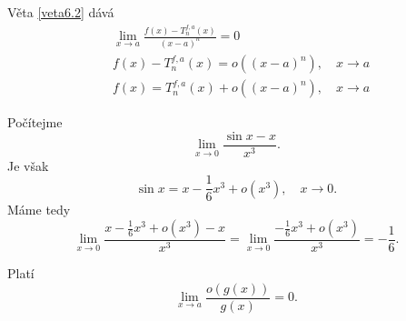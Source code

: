 \begin{poznamka}
	Věta \ref{veta6.2} dává
	\begin{align*}
	&\lim_{x\to a} \frac{f(x)-T_n^{f,a}(x)}{(x-a)^n}=0\\
	& f(x)- T_n^{f,a}(x)=o((x-a)^n), \quad x\to a\\
	& f(x)= T_n^{f,a}(x) + o((x-a)^n), \quad x \to a
\end{align*}
\end{poznamka}

\begin{priklad}
Počítejme
	$$
 \lim_{x \to 0} \frac{\sin x -x}{x^3}.
	$$
	Je však
	$$
	    \sin x  = x - \frac{1}{6}x^3 + o(x^3), \quad x \to 0.
	$$
	Máme tedy
	$$
	\lim_{x \to 0} \frac{x - \frac{1}{6}x^3 + o(x^3) -x}{x^3} = \lim_{x\to 0} \frac{-\frac{1}{6}x^3+o(x^3)}{x^3}=-\frac{1}{6}.
	$$
\end{priklad}

\begin{poznamka}
Platí
	$$
 \lim_{x\to a} \frac{o(g(x))}{g(x)}=0.
	$$
\end{poznamka}

